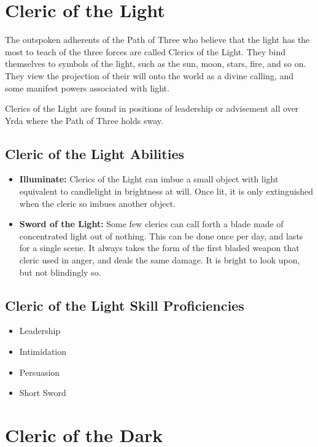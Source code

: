 \begin{multicols}{2}
\section{Cleric of the Light}

The outspoken adherents of the Path of Three who believe that the
light has the most to teach of the three forces are called Clerics
of the Light. They bind themselves to symbols of the light, such as
the sun, moon, stars, fire, and so on. They view the projection of
their will onto the world as a divine calling, and some manifest
powers associated with light.

Clerics of the Light are found in positions of leadership or advisement
all over Yrda where the Path of Three holds sway.

\subsection{Cleric of the Light Abilities}

\begin{itemize}
  \item \textbf{Illuminate:} Clerics of the Light can imbue a small object
    with light equivalent to candlelight in brightness at will. Once lit,
    it is only extinguished when the cleric so imbues another object.
  \item \textbf{Sword of the Light:} Some few clerics can call forth a
    blade made of concentrated light out of nothing. This can be done once
    per day, and lasts for a single scene. It always takes the form of the
    first bladed weapon that cleric used in anger, and deals the same damage.
    It is bright to look upon, but not blindingly so.
\end{itemize}

\subsection{Cleric of the Light Skill Proficiencies}

\begin{itemize}
  \item Leadership
  \item Intimidation
  \item Persuasion
  \item Short Sword
\end{itemize}

\section{Cleric of the Dark}


\end{multicols}

